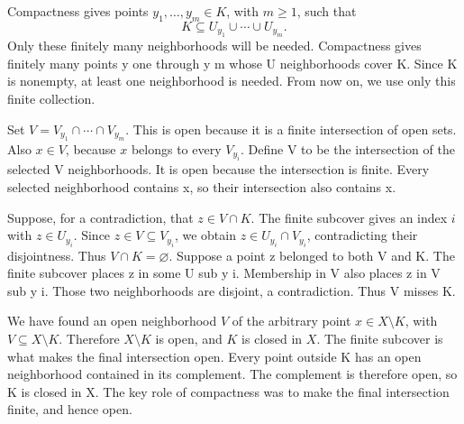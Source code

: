 \documentclass{article}
\begin{document}
{Compactness gives points $y_1,\ldots,y_m\in K$, with $m\ge1$, such that
\[K\subseteq U_{y_1}\cup\cdots\cup U_{y_m}.\]
Only these finitely many neighborhoods will be needed.}
{Compactness gives finitely many points y one through y m whose U neighborhoods cover K. Since K is nonempty, at least one neighborhood is needed. From now on, we use only this finite collection.}

{Set $V=V_{y_1}\cap\cdots\cap V_{y_m}$. This is open because it is a finite intersection of open sets. Also $x\in V$, because $x$ belongs to every $V_{y_i}$.}
{Define V to be the intersection of the selected V neighborhoods. It is open because the intersection is finite. Every selected neighborhood contains x, so their intersection also contains x.}

{Suppose, for a contradiction, that $z\in V\cap K$. The finite subcover gives an index $i$ with $z\in U_{y_i}$. Since $z\in V\subseteq V_{y_i}$, we obtain $z\in U_{y_i}\cap V_{y_i}$, contradicting their disjointness. Thus $V\cap K=\varnothing$.}
{Suppose a point z belonged to both V and K. The finite subcover places z in some U sub y i. Membership in V also places z in V sub y i. Those two neighborhoods are disjoint, a contradiction. Thus V misses K.}

{We have found an open neighborhood $V$ of the arbitrary point $x\in X\setminus K$, with $V\subseteq X\setminus K$. Therefore $X\setminus K$ is open, and $K$ is closed in $X$. The finite subcover is what makes the final intersection open.}
{Every point outside K has an open neighborhood contained in its complement. The complement is therefore open, so K is closed in X. The key role of compactness was to make the final intersection finite, and hence open.}
\end{document}
